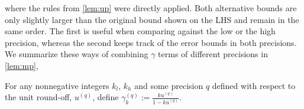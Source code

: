 \documentclass[review,onefignum,onetabnum]{siamart190516}
\newcommand{\tth}{\theta}
\newcommand{\cO}{\mathcal{O}}
\begin{document}
where the rules from \cref{lem:up} were directly applied.
Both alternative bounds are only slightly larger than the original bound shown on the LHS and remain in the same order.
The first is useful when comparing against the low or the high precision, whereas the second keeps track of the error bounds in both precisions.
We summarize these ways of combining $\gamma$ terms of different precisions in \cref{lem:mp},
\begin{lemma}\label{lem:mp}
	For any nonnegative integers $k_l$, $k_h$ and some precision $q$ defined with respect to the unit round-off, $u^{(q)}$, define $\gamma^{(q)}_{k} := \frac{k u^{(q)} }{1-ku^{(q)}}$.

\end{lemma}
\end{document}
